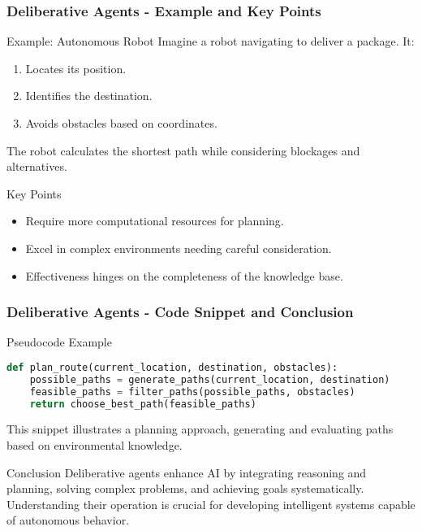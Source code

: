 \documentclass[aspectratio=169]{beamer}
\begin{document}
\begin{frame}[fragile]
    \frametitle{Deliberative Agents - Example and Key Points}
    \begin{block}{Example: Autonomous Robot}
        Imagine a robot navigating to deliver a package. It:
        \begin{enumerate}
            \item Locates its position.
            \item Identifies the destination.
            \item Avoids obstacles based on coordinates.
        \end{enumerate}
        The robot calculates the shortest path while considering blockages and alternatives.
    \end{block}
    
    \begin{block}{Key Points}
        \begin{itemize}
            \item Require more computational resources for planning.
            \item Excel in complex environments needing careful consideration.
            \item Effectiveness hinges on the completeness of the knowledge base.
        \end{itemize}
    \end{block}
\end{frame}

\begin{frame}[fragile]
    \frametitle{Deliberative Agents - Code Snippet and Conclusion}
    \begin{block}{Pseudocode Example}
        \begin{lstlisting}[language=Python]
def plan_route(current_location, destination, obstacles):
    possible_paths = generate_paths(current_location, destination)
    feasible_paths = filter_paths(possible_paths, obstacles)
    return choose_best_path(feasible_paths)
        \end{lstlisting}
        This snippet illustrates a planning approach, generating and evaluating paths based on environmental knowledge.
    \end{block}
    
    \begin{block}{Conclusion}
        Deliberative agents enhance AI by integrating reasoning and planning, solving complex problems, and achieving goals systematically. Understanding their operation is crucial for developing intelligent systems capable of autonomous behavior.
    \end{block}
\end{frame}
\end{document}
